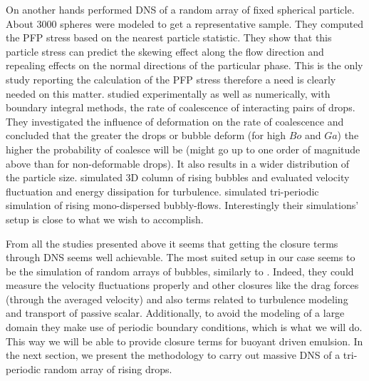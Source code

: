 On another hands \citet{wang2021numerical} performed DNS of a random array of fixed spherical particle.
About 3000 spheres were modeled to get a representative sample. 
They computed the PFP stress based on the nearest particle statistic.
They show that this particle stress can predict the skewing effect along the flow direction and repealing effects on the normal directions of the particular phase. 
This is the only study reporting the calculation of the PFP stress therefore a need is clearly needed on this matter.
\citet{manga1995collective} studied experimentally as well as numerically, with boundary integral methods, the rate of coalescence of interacting pairs of drops.
They investigated the influence of deformation on the rate of coalescence and concluded that the greater the drops or bubble deform (for high $Bo$ and  $Ga$) the higher the probability of coalesce will be (might go up to one order of magnitude above than for non-deformable drops).
It also results in a wider distribution of the particle size.
\citet{innocenti2020direct} simulated 3D column of rising bubbles and evaluated velocity fluctuation and energy dissipation for turbulence. 
\citet{hidman2023assessing} simulated tri-periodic simulation of rising mono-dispersed bubbly-flows. 
Interestingly their simulations'  setup is close to what we wish to accomplish. 


From all the studies presented above it seems that getting the closure terms through DNS seems well achievable.
The most suited setup in our case seems to be the simulation of random arrays of bubbles, similarly to \citet{hidman2023assessing}.
Indeed, they could measure the velocity fluctuations properly and other closures like the drag forces (through the averaged velocity) and also terms related to turbulence modeling and transport of passive scalar. 
Additionally, to avoid the modeling of a large domain they make use of periodic boundary conditions, which is what we will do.
This way we will be able to provide closure terms for buoyant driven emulsion.
In the next section, we present the methodology to carry out massive DNS of a tri-periodic random array of rising drops.


